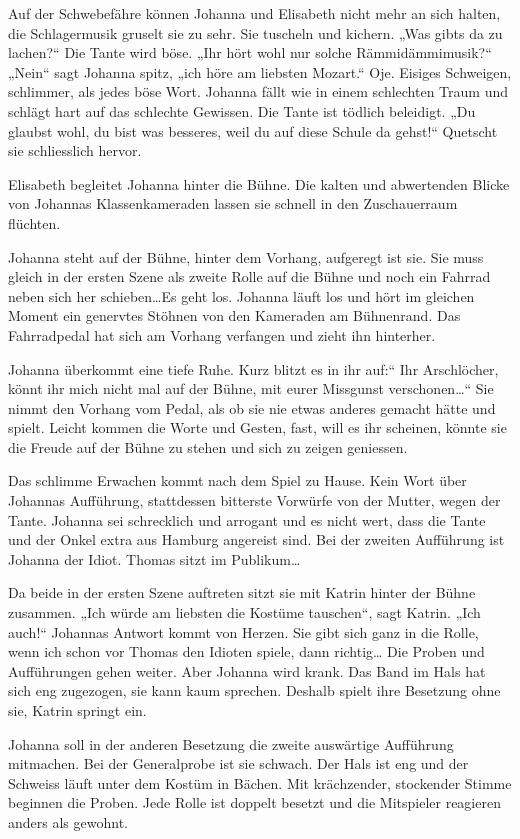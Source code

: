 \documentclass[10pt,titlepage,a5paper]{book}
\begin{document}
Auf der Schwebefähre können Johanna und Elisabeth nicht mehr an sich halten, die Schlagermusik gruselt sie zu sehr. Sie tuscheln und kichern. 
„Was gibts da zu lachen?“ Die Tante wird böse. „Ihr hört wohl nur solche Rämmidämmimusik?“ „Nein“ sagt Johanna spitz, „ich höre am liebsten Mozart.“ Oje. Eisiges Schweigen, schlimmer, als jedes böse Wort. Johanna fällt wie in einem schlechten Traum und schlägt hart auf das schlechte Gewissen. Die Tante ist tödlich beleidigt. „Du glaubst wohl, du bist was besseres, weil du auf diese Schule da gehst!“ Quetscht sie schliesslich hervor. 

Elisabeth begleitet Johanna hinter die Bühne. Die kalten und abwertenden Blicke von Johannas Klassenkameraden lassen sie sch\-nell in den Zuschauerraum flüchten. 

Johanna steht auf der Bühne, hinter dem Vorhang, aufgeregt ist sie. Sie muss gleich in der ersten Szene als zweite Rolle auf die Bühne und noch ein Fahrrad neben sich her schieben\dots  Es geht los. Johanna läuft los und hört im gleichen Moment ein genervtes Stöhnen von den Kameraden am Bühnenrand. Das Fahrradpedal hat sich am Vorhang verfangen und zieht ihn hinterher. 

Johanna  überkommt eine tiefe Ruhe. Kurz blitzt es in ihr auf:“ Ihr Arschlöcher, könnt ihr mich nicht mal auf der Bühne, mit eurer Missgunst verschonen\dots “ Sie nimmt den Vorhang vom Pedal, als  ob sie nie etwas anderes gemacht hätte und spielt. Leicht kommen die Worte und Gesten, fast, will es ihr scheinen, könnte sie die Freude auf der Bühne zu stehen und sich zu zeigen geniessen.

Das schlimme Erwachen kommt nach dem Spiel zu Hause. Kein Wort über Johannas Aufführung, stattdessen bitterste Vorwürfe von der Mutter, wegen der Tante. Johanna sei schrecklich und arrogant und es nicht wert, dass die Tante und der Onkel extra aus Hamburg angereist sind. 
Bei der zweiten Aufführung ist Johanna der Idiot. Thomas sitzt im Publikum\dots 

Da beide in der ersten Szene auftreten sitzt sie mit Katrin hinter der Bühne zusammen. „Ich würde am liebsten die Kostüme tauschen“, sagt Katrin. „Ich auch!“ Johannas Antwort kommt von Herzen. Sie gibt sich ganz in die Rolle, wenn ich schon vor Thomas den Idioten spiele, dann richtig\dots 
Die Proben und Aufführungen gehen weiter. Aber Johanna wird krank. Das Band im Hals hat sich eng zugezogen, sie kann kaum sprechen. Deshalb spielt ihre Besetzung ohne sie, Katrin springt ein.

Johanna soll in der anderen Besetzung die zweite auswärtige Auf\-führung mitmachen. Bei der Generalprobe ist sie schwach. Der Hals ist eng und der Schweiss läuft unter dem Kostüm in Bächen. Mit krächzender, stockender Stimme beginnen die Proben. Jede Rolle ist doppelt besetzt und die Mitspieler reagieren anders als gewohnt.
\end{document}
